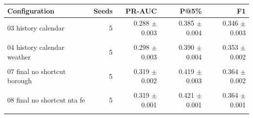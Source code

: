 \begin{tabular}{@{}lrrrr@{}}
\toprule
Configuration & Seeds & PR-AUC & P@5\% & F1 \\
\midrule
03 history calendar & 5 & 0.288 $\pm$ 0.003 & 0.385 $\pm$ 0.004 & 0.346 $\pm$ 0.003 \\\\
04 history calendar weather & 5 & 0.298 $\pm$ 0.003 & 0.390 $\pm$ 0.004 & 0.353 $\pm$ 0.002 \\\\
07 final no shortcut borough & 5 & 0.319 $\pm$ 0.002 & 0.419 $\pm$ 0.003 & 0.364 $\pm$ 0.002 \\\\
08 final no shortcut nta fe & 5 & 0.319 $\pm$ 0.001 & 0.421 $\pm$ 0.001 & 0.364 $\pm$ 0.001 \\\\
\bottomrule
\end{tabular}
